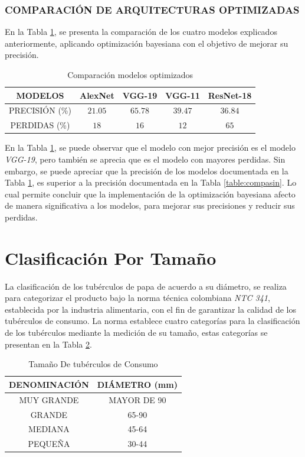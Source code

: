 \subsubsection{\MakeUppercase{Comparación de Arquitecturas Optimizadas}}

En la Tabla \ref{table:compacon}, se presenta la comparación de los cuatro modelos explicados anteriormente, aplicando optimización bayesiana con el objetivo de mejorar su precisión.

\begin{table}[ht]
	\centering
	\begin{tabular}{|c|c|c|c|c|}
		\hline
		MODELOS & AlexNet & VGG-19 & VGG-11 & ResNet-18 \\
		\hline
		PRECISIÓN (\%) & $$21.05$$ & $$65.78$$ & $$39.47$$ & $$36.84$$ \\
		\hline
		PERDIDAS (\%) & $$18$$ & $$16$$ & $$12$$ & $$65$$ \\
		\hline
	\end{tabular}	
	\caption{Comparación modelos optimizados}
	\label{table:compacon}
\end{table}	

En la Tabla \ref{table:compacon}, se puede observar que el modelo con mejor precisión es el modelo \textit{VGG-19}, pero también se aprecia que es el modelo con mayores perdidas. Sin embargo, se puede apreciar que la precisión de los modelos documentada en la Tabla \ref{table:compacon}, es superior a la precisión documentada en la Tabla \ref{table:compasin}. Lo cual permite concluir que la implementación de la optimización bayesiana afecto de manera significativa a los modelos, para mejorar sus precisiones y reducir sus perdidas.


\newpage		
\section{Clasificación Por Tamaño}

La clasificación de los tubérculos de papa de acuerdo a su diámetro, se realiza para categorizar el producto bajo la norma técnica colombiana \textit{NTC 341}, establecida por la industria alimentaria, con el fin de garantizar la calidad de los tubérculos de consumo. 	La norma establece cuatro categorías para la clasificación de los tubérculos mediante la medición de su tamaño, estas categorías se presentan en la Tabla \ref{table:limites}.

\begin{table}[ht]
	\centering
	\begin{tabular}{|c|c|}
		\hline
		DENOMINACIÓN & DIÁMETRO (mm) \\
		\hline
		MUY GRANDE & MAYOR DE 90 \\
		\hline
		GRANDE & 65-90 \\
		\hline
		MEDIANA	& 45-64 \\
		\hline
		PEQUEÑA & 30-44 \\
		\hline
	\end{tabular}	
	\caption{Tamaño De tubérculos de Consumo}
	\label{table:limites}
\end{table}	


